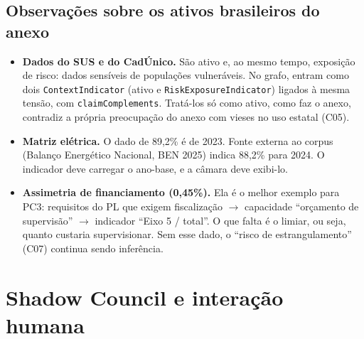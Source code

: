 \documentclass[12pt,a4paper,oneside,english,brazil]{abntex2}
\begin{document}

\section{Observações sobre os ativos brasileiros do anexo}
\begin{itemize}[leftmargin=*]
  \item \textbf{Dados do SUS e do CadÚnico.} São ativo e, ao mesmo tempo, exposição de risco: dados sensíveis de populações vulneráveis. No grafo, entram como dois \texttt{ContextIndicator} (ativo e \texttt{RiskExposureIndicator}) ligados à mesma tensão, com \texttt{claimComplements}. Tratá-los só como ativo, como faz o anexo, contradiz a própria preocupação do anexo com vieses no uso estatal (C05).
  \item \textbf{Matriz elétrica.} O dado de 89,2\% é de 2023. Fonte externa ao corpus (Balanço Energético Nacional, BEN 2025) indica 88,2\% para 2024. O indicador deve carregar o ano-base, e a câmara deve exibi-lo.
  \item \textbf{Assimetria de financiamento (0,45\%).} Ela é o melhor exemplo para PC3: requisitos do PL que exigem fiscalização $\to$ capacidade ``orçamento de supervisão'' $\to$ indicador ``Eixo 5 / total''. O que falta é o limiar, ou seja, quanto custaria supervisionar. Sem esse dado, o ``risco de estrangulamento'' (C07) continua sendo inferência.
\end{itemize}

\chapter{Shadow Council e interação humana}\label{sec:sc}
\end{document}
